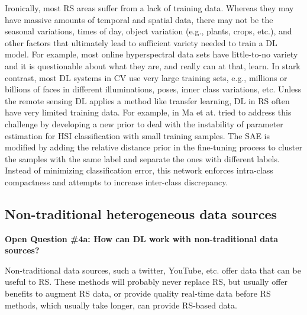 \documentclass[12pt]{spieman}
\begin{document}
\begin{spacing}{1}
Ironically, most RS areas suffer from a lack of training data. Whereas they may have massive amounts of temporal and spatial data, there may not be the seasonal variations, times of day, object variation (e.g., plants, crops, etc.), and other factors that ultimately lead to sufficient variety needed to train a DL model. For example, most online hyperspectral data sets have little-to-no variety and it is questionable about what they are, and really can at that, learn. In stark contrast, most DL systems in CV use very large training sets, e.g., millions or billions of faces in different illuminations, poses, inner class variations, etc. Unless the remote sensing DL applies a method like transfer learning, DL in RS often have very limited training data. For example, in \cite{ma2016hyperspectral} Ma et at. tried to address this challenge by developing a new prior to deal with the instability of parameter estimation for HSI classification with small training samples. The SAE is modified by adding the relative distance prior in the fine-tuning process to cluster the samples with the same label and separate the ones with different labels. Instead of minimizing classification error, this network enforces intra-class compactness and attempts to increase inter-class discrepancy. 

%
%
\subsection{Non-traditional heterogeneous data sources}
\label{subsec:ChallengesOpportunities_iv} \textbf{Open Question \#4a: How can DL work with non-traditional data sources?} 

Non-traditional data sources, such a twitter, YouTube, etc. offer data that can be useful to RS. These methods will probably never replace RS, but usually offer benefits to augment RS data, or provide quality real-time data before RS methods, which usually take longer, can provide RS-based data.


\end{spacing}
\end{document}
